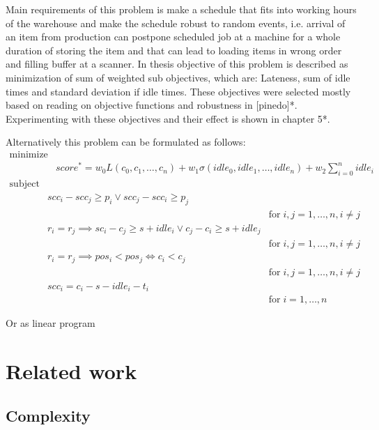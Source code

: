 \documentclass{ctuthesis}
\begin{document}
Main requirements of this problem is make a schedule that fits into working hours of the warehouse and make the schedule robust to random events, i.e. arrival of an item from production can postpone scheduled job at a machine for a whole duration of storing the item and that can lead to loading items in wrong order and filling buffer at a scanner. In thesis objective of this problem is described as minimization of sum of weighted sub objectives, which are: Lateness, sum of idle times and standard deviation if idle times. These objectives were selected mostly based on reading on objective functions and robustness in [pinedo]*. Experimenting with these objectives and their effect is shown in chapter 5*.

Alternatively this problem can be formulated as follows:
\begin{equation}
\begin{aligned}
\text{minimize}\\
& score^* = w_0L(c_0, c_1, \ldots, c_n) + w_1\sigma(idle_0, idle_1, \ldots, idle_n) + w_2\sum_{i=0}^{n}idle_i
\end{aligned}
\end{equation}
\begin{equation}
\begin{aligned}
\text{subject to}\\
& scc_i - scc_j \geq p_i \lor scc_j - scc_i \geq p_j\\ && \text{for}\; i,j = 1, \ldots, n, i \neq j\\
& r_i = r_j \implies sc_i - c_j \geq s + idle_i \lor c_j - c_i \geq s + idle_j\\ && \text{for}\; i,j = 1, \ldots, n, i \neq j\\
& r_i = r_j \implies pos_i < pos_j \iff c_i < c_j\\ && \text{for}\; i,j = 1, \ldots, n, i \neq j\\
& scc_i = c_i - s - idle_i - t_i\\ && \text{for}\; i = 1, \ldots, n

\end{aligned}
\end{equation}

Or as linear program


\chapter{Related work}
\section{Complexity}
\end{document}
